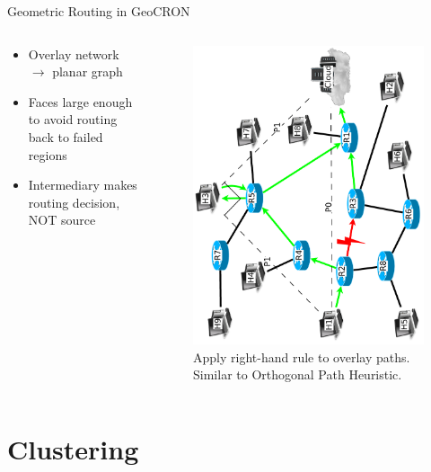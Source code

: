 \documentclass[pdftex]{beamer}
\begin{document}
\begin{frame}{Geometric Routing in GeoCRON}
\begin{columns}
\begin{column}{.5\textwidth}
	\begin{itemize}
		\item Overlay network $\rightarrow$ planar graph
		\item Faces large enough to avoid routing back to failed regions
		\item Intermediary makes routing decision, NOT source
\end{itemize}
\end{column}

\begin{column}{.5\textwidth}
\begin{figure}
\includegraphics[height=\textwidth, angle=-90]{angular_path}
\caption{Apply right-hand rule to overlay paths.  Similar to Orthogonal Path Heuristic.}
\end{figure}
\end{column}
\end{columns}
\end{frame}

\section{Clustering}
\end{document}
